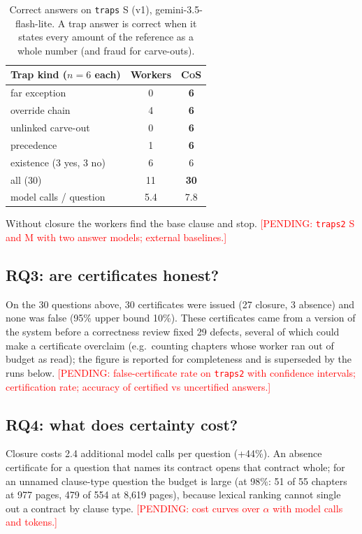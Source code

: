 \documentclass[11pt]{article}
\newcommand{\system}{\textsc{CoS}}          %
\newcommand{\pending}[1]{\textcolor{red}{[PENDING: #1]}}   %
\begin{document}
\begin{table}[t]
\centering\small
\begin{tabular}{lcc}
\toprule
Trap kind ($n{=}6$ each) & Workers & \system{} \\
\midrule
far exception & 0 & \textbf{6} \\
override chain & 4 & \textbf{6} \\
unlinked carve-out & 0 & \textbf{6} \\
precedence & 1 & \textbf{6} \\
existence (3 yes, 3 no) & 6 & 6 \\
\midrule
all (30) & 11 & \textbf{30} \\
model calls / question & 5.4 & 7.8 \\
\bottomrule
\end{tabular}
\caption{Correct answers on \texttt{traps} S (v1), gemini-3.5-flash-lite. A trap answer is correct when it states every amount of the reference as a whole number (and fraud for carve-outs).}
\label{tab:rq2}
\end{table}

\noindent Without closure the workers find the base clause and stop. \pending{\texttt{traps2} S and M with two answer models; external baselines.}

\subsection{RQ3: are certificates honest?}
On the 30 questions above, 30 certificates were issued (27 closure, 3 absence) and none was false (95\% upper bound 10\%). These certificates came from a version of the system before a correctness review fixed 29 defects, several of which could make a certificate overclaim (e.g.\ counting chapters whose worker ran out of budget as read); the figure is reported for completeness and is superseded by the runs below. \pending{false-certificate rate on \texttt{traps2} with confidence intervals; certification rate; accuracy of certified vs uncertified answers.}

\subsection{RQ4: what does certainty cost?}
Closure costs 2.4 additional model calls per question (+44\%). An absence certificate for a question that names its contract opens that contract whole; for an unnamed clause-type question the budget is large (at 98\%: 51 of 55 chapters at 977 pages, 479 of 554 at 8,619 pages), because lexical ranking cannot single out a contract by clause type. \pending{cost curves over $\alpha$ with model calls and tokens.}
\end{document}
